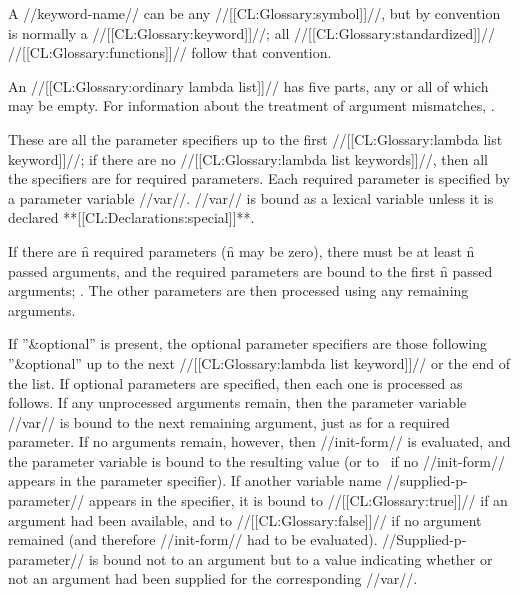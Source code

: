 A //keyword-name// can be any //[[CL:Glossary:symbol]]//, 
but by convention is normally a //[[CL:Glossary:keyword]]//;
all //[[CL:Glossary:standardized]]// //[[CL:Glossary:functions]]// follow that convention.


An //[[CL:Glossary:ordinary lambda list]]// has five parts, any or all of which may be empty.
For information about the treatment of argument mismatches,
\seesection\FuncallErrorChecking.




     
These are all the parameter specifiers up to 
the first //[[CL:Glossary:lambda list keyword]]//;
if there are no //[[CL:Glossary:lambda list keywords]]//, 
then all the specifiers are for required parameters.
Each required parameter is specified by a parameter variable //var//.
//var// is bound as a lexical variable unless it is declared **[[CL:Declarations:special]]**.


If there are \f{n} required parameters (\f{n} may be zero), 
there must be at least \f{n} passed arguments, and the 
required parameters are bound to the first \f{n} passed arguments;
\seesection\FuncallErrorChecking.
The other parameters are then processed using any remaining arguments.

\endsubsubsection%




If ''&optional'' is present,
the optional parameter specifiers are those following 
''&optional'' 
up to the next //[[CL:Glossary:lambda list keyword]]// or the end of the list.
If optional parameters are specified, then each one is processed as
follows.  If any unprocessed arguments remain, then the parameter variable
//var// is bound to the next remaining argument, just as for a required
parameter.  If no arguments remain, however, then //init-form// 
is evaluated, and the parameter variable
is bound to the resulting value 
(or to \nil\ if no //init-form// appears
in the parameter specifier).
If another variable name //supplied-p-parameter// 
appears in the specifier, it is bound
to //[[CL:Glossary:true]]// if an argument had been available, and to //[[CL:Glossary:false]]// if no
argument remained (and therefore //init-form// had to be evaluated).
//Supplied-p-parameter//
is bound not to an argument but to a value indicating whether or not
an argument had been supplied for the corresponding //var//.

